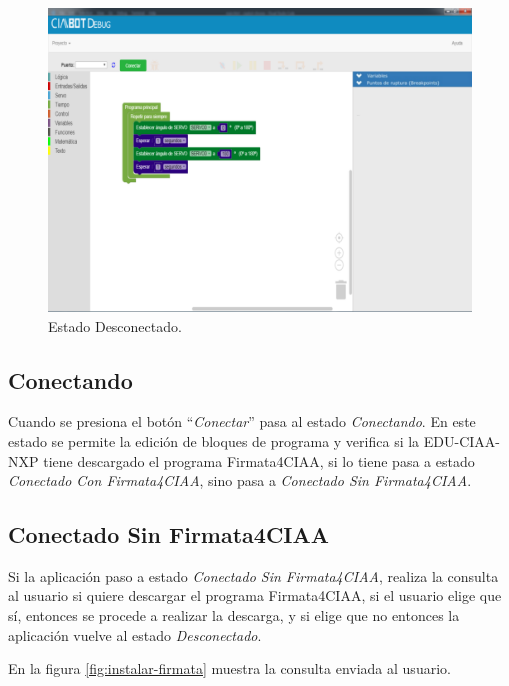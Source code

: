 \begin{figure}[!htbp]
	\begin{center}  %
		\includegraphics[width=15cm]{./Figures/debug-inicio.png}
		\par\caption{Estado Desconectado.}\label{fig:desconectado}
	\end{center}
\end{figure}


\subsection{Conectando}
\label{subsec:Conectando}

Cuando se presiona el botón “\emph{Conectar}” pasa al estado \emph{Conectando}. En este estado se permite la edición de bloques de programa y verifica si la EDU-CIAA-NXP tiene descargado el programa Firmata4CIAA, si lo tiene pasa a estado \emph{Conectado Con Firmata4CIAA}, sino pasa a \emph{Conectado Sin Firmata4CIAA}.

\subsection{Conectado Sin Firmata4CIAA}
\label{subsec:Conectado Sin Firmata4CIAA}

Si la aplicación paso a estado \emph{Conectado Sin Firmata4CIAA}, realiza la consulta al usuario si quiere descargar el programa Firmata4CIAA, si el usuario elige que sí, entonces se procede a realizar la descarga, y si elige que no entonces la aplicación vuelve al estado \emph{Desconectado}.

En la figura \ref{fig:instalar-firmata} muestra la consulta enviada al usuario.


